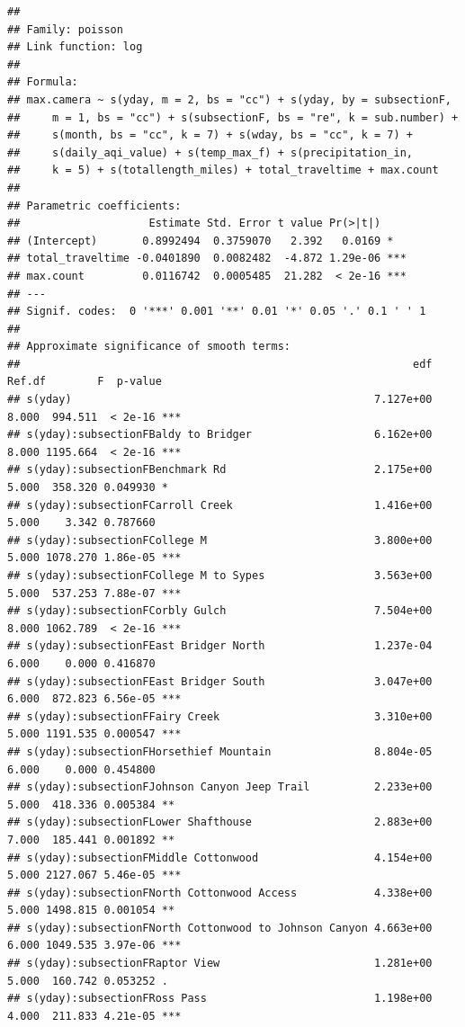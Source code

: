 \documentclass[
]{book}
\begin{document}
\begin{verbatim}
## 
## Family: poisson 
## Link function: log 
## 
## Formula:
## max.camera ~ s(yday, m = 2, bs = "cc") + s(yday, by = subsectionF, 
##     m = 1, bs = "cc") + s(subsectionF, bs = "re", k = sub.number) + 
##     s(month, bs = "cc", k = 7) + s(wday, bs = "cc", k = 7) + 
##     s(daily_aqi_value) + s(temp_max_f) + s(precipitation_in, 
##     k = 5) + s(totallength_miles) + total_traveltime + max.count
## 
## Parametric coefficients:
##                    Estimate Std. Error t value Pr(>|t|)    
## (Intercept)       0.8992494  0.3759070   2.392   0.0169 *  
## total_traveltime -0.0401890  0.0082482  -4.872 1.29e-06 ***
## max.count         0.0116742  0.0005485  21.282  < 2e-16 ***
## ---
## Signif. codes:  0 '***' 0.001 '**' 0.01 '*' 0.05 '.' 0.1 ' ' 1
## 
## Approximate significance of smooth terms:
##                                                             edf Ref.df        F  p-value    
## s(yday)                                               7.127e+00  8.000  994.511  < 2e-16 ***
## s(yday):subsectionFBaldy to Bridger                   6.162e+00  8.000 1195.664  < 2e-16 ***
## s(yday):subsectionFBenchmark Rd                       2.175e+00  5.000  358.320 0.049930 *  
## s(yday):subsectionFCarroll Creek                      1.416e+00  5.000    3.342 0.787660    
## s(yday):subsectionFCollege M                          3.800e+00  5.000 1078.270 1.86e-05 ***
## s(yday):subsectionFCollege M to Sypes                 3.563e+00  5.000  537.253 7.88e-07 ***
## s(yday):subsectionFCorbly Gulch                       7.504e+00  8.000 1062.789  < 2e-16 ***
## s(yday):subsectionFEast Bridger North                 1.237e-04  6.000    0.000 0.416870    
## s(yday):subsectionFEast Bridger South                 3.047e+00  6.000  872.823 6.56e-05 ***
## s(yday):subsectionFFairy Creek                        3.310e+00  5.000 1191.535 0.000547 ***
## s(yday):subsectionFHorsethief Mountain                8.804e-05  6.000    0.000 0.454800    
## s(yday):subsectionFJohnson Canyon Jeep Trail          2.233e+00  5.000  418.336 0.005384 ** 
## s(yday):subsectionFLower Shafthouse                   2.883e+00  7.000  185.441 0.001892 ** 
## s(yday):subsectionFMiddle Cottonwood                  4.154e+00  5.000 2127.067 5.46e-05 ***
## s(yday):subsectionFNorth Cottonwood Access            4.338e+00  5.000 1498.815 0.001054 ** 
## s(yday):subsectionFNorth Cottonwood to Johnson Canyon 4.663e+00  6.000 1049.535 3.97e-06 ***
## s(yday):subsectionFRaptor View                        1.281e+00  5.000  160.742 0.053252 .  
## s(yday):subsectionFRoss Pass                          1.198e+00  4.000  211.833 4.21e-05 ***

\end{verbatim}
\end{document}
